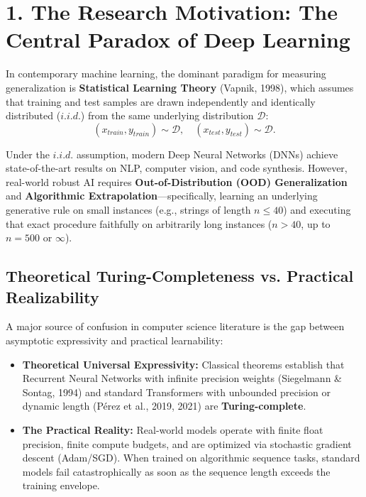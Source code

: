 \documentclass[11pt,a4paper]{article}
\begin{document}
\section{1. The Research Motivation: The Central Paradox of Deep Learning}

In contemporary machine learning, the dominant paradigm for measuring generalization is \textbf{Statistical Learning Theory} (Vapnik, 1998), which assumes that training and test samples are drawn independently and identically distributed ($i.i.d.$) from the same underlying distribution $\mathcal{D}$:
\begin{equation}
    (x_{train}, y_{train}) \sim \mathcal{D}, \quad (x_{test}, y_{test}) \sim \mathcal{D}.
\end{equation}

Under the $i.i.d.$ assumption, modern Deep Neural Networks (DNNs) achieve state-of-the-art results on NLP, computer vision, and code synthesis. However, real-world robust AI requires \textbf{Out-of-Distribution (OOD) Generalization} and \textbf{Algorithmic Extrapolation}---specifically, learning an underlying generative rule on small instances (e.g., strings of length $n \le 40$) and executing that exact procedure faithfully on arbitrarily long instances ($n > 40$, up to $n = 500$ or $\infty$).

\subsection{Theoretical Turing-Completeness vs. Practical Realizability}
A major source of confusion in computer science literature is the gap between asymptotic expressivity and practical learnability:
\begin{itemize}[leftmargin=1.5em, itemsep=2pt]
    \item \textbf{Theoretical Universal Expressivity:} Classical theorems establish that Recurrent Neural Networks with infinite precision weights (Siegelmann \& Sontag, 1994) and standard Transformers with unbounded precision or dynamic length (P{\'e}rez et al., 2019, 2021) are \textbf{Turing-complete}.
    \item \textbf{The Practical Reality:} Real-world models operate with finite float precision, finite compute budgets, and are optimized via stochastic gradient descent (Adam/SGD). When trained on algorithmic sequence tasks, standard models fail catastrophically as soon as the sequence length exceeds the training envelope.
\end{itemize}
\end{document}
